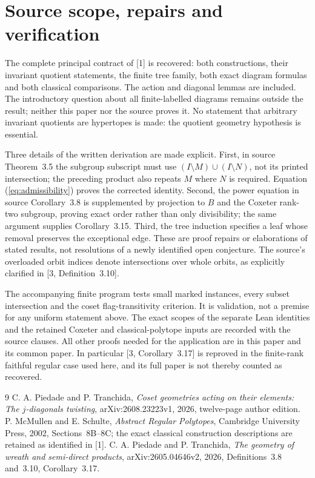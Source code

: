 \section{Source scope, repairs and verification}
The complete principal contract of [1] is recovered: both constructions, their invariant quotient statements, the finite tree family, both exact diagram formulas and both classical comparisons. The action and diagonal lemmas are included. The introductory question about all finite-labelled diagrams remains outside the result; neither this paper nor the source proves it. No statement that arbitrary invariant quotients are hypertopes is made: the quotient geometry hypothesis is essential.

Three details of the written derivation are made explicit. First, in source Theorem~3.5 the subgroup subscript must use $(I\setminus M)\cup(I\setminus N)$, not its printed intersection; the preceding product also repeats $M$ where $N$ is required. Equation (\ref{eq:admissibility}) proves the corrected identity. Second, the power equation in source Corollary~3.8 is supplemented by projection to $B$ and the Coxeter rank-two subgroup, proving exact order rather than only divisibility; the same argument supplies Corollary~3.15. Third, the tree induction specifies a leaf whose removal preserves the exceptional edge. These are proof repairs or elaborations of stated results, not resolutions of a newly identified open conjecture. The source's overloaded orbit indices denote intersections over whole orbits, as explicitly clarified in [3, Definition~3.10].

The accompanying finite program tests small marked instances, every subset intersection and the coset flag-transitivity criterion. It is validation, not a premise for any uniform statement above. The exact scopes of the separate Lean identities and the retained Coxeter and classical-polytope inputs are recorded with the source clauses. All other proofs needed for the application are in this paper and its common paper. In particular [3, Corollary~3.17] is reproved in the finite-rank faithful regular case used here, and its full paper is not thereby counted as recovered.
\begin{thebibliography}{9}
 C. A. Piedade and P. Tranchida, \emph{Coset geometries acting on their elements: The $j$-diagonals twisting}, arXiv:2608.23223v1, 2026, twelve-page author edition.
 P. McMullen and E. Schulte, \emph{Abstract Regular Polytopes}, Cambridge University Press, 2002, Sections~8B--8C; the exact classical construction descriptions are retained as identified in [1].
 C. A. Piedade and P. Tranchida, \emph{The geometry of wreath and semi-direct products}, arXiv:2605.04646v2, 2026, Definitions~3.8 and~3.10, Corollary~3.17.
\end{thebibliography}

